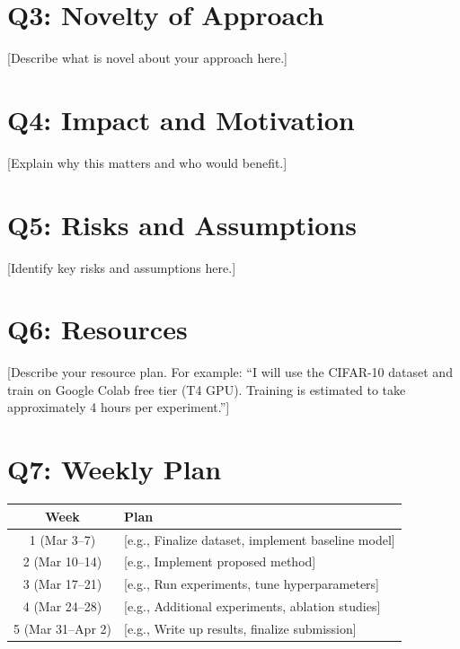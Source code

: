\documentclass[11pt, letterpaper]{article}
\begin{document}
\section*{Q3: Novelty of Approach}

[Describe what is novel about your approach here.]

\section*{Q4: Impact and Motivation}

[Explain why this matters and who would benefit.]

\section*{Q5: Risks and Assumptions}

[Identify key risks and assumptions here.]

\section*{Q6: Resources}

[Describe your resource plan. For example: ``I will use the CIFAR-10 dataset \citep{krizhevsky2009learning} and train on Google Colab free tier (T4 GPU). Training is estimated to take approximately 4 hours per experiment.'']

\section*{Q7: Weekly Plan}

\begin{center}
\renewcommand{\arraystretch}{1.3}
\begin{tabular}{cl}
\toprule
\textbf{Week} & \textbf{Plan} \\
\midrule
1 (Mar 3--7) & [e.g., Finalize dataset, implement baseline model] \\
2 (Mar 10--14) & [e.g., Implement proposed method] \\
3 (Mar 17--21) & [e.g., Run experiments, tune hyperparameters] \\
4 (Mar 24--28) & [e.g., Additional experiments, ablation studies] \\
5 (Mar 31--Apr 2) & [e.g., Write up results, finalize submission] \\
\bottomrule
\end{tabular}
\end{center}
\end{document}

